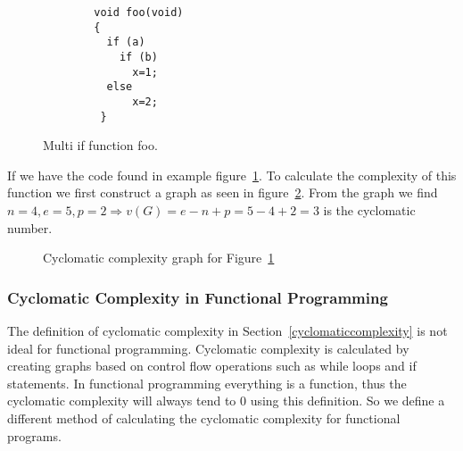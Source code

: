 \documentclass[12pt]{article}
\theoremstyle{definition}
\theoremstyle{theorem}
\begin{document}
\begin{figure}[H]
    \begin{lstlisting}
        void foo(void)
        {
          if (a)
            if (b) 
              x=1;
          else
              x=2;
         }
    \end{lstlisting}
    \caption{Multi if function foo.}\label{c1excode}
\end{figure}

If we have the code found in example figure~\ref{c1excode}. To calculate the
complexity of this function we first construct a graph as seen in
figure~\ref{fig:c1exgraph}. From the graph we find $n=4, e=5, p=2\Rightarrow
v(G)=e-n+p=5-4+2=3$ is the cyclomatic number.

\begin{figure}[H]
    \centering
    \caption{Cyclomatic complexity graph for Figure~\ref{c1excode}}\label{fig:c1exgraph}
\end{figure}

\subsubsection{Cyclomatic Complexity in Functional Programming}

The definition of cyclomatic complexity in Section~\ref{cyclomaticcomplexity} is
not ideal for functional programming. Cyclomatic complexity is calculated by
creating graphs based on control flow operations such as while loops and if
statements. In functional programming everything is a function, thus the
cyclomatic complexity will always tend to 0 using this definition. So we define
a different method of calculating the cyclomatic complexity for functional
programs. 
\end{document}

